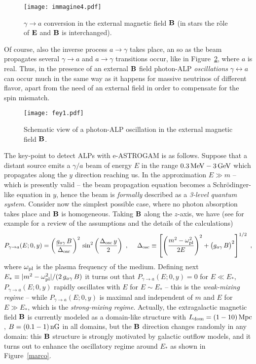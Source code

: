 \documentclass[aps,12pt,tightenlines,amsmath,amssymb]{revtex4}
\begin{document}
\begin{figure}[h]
\centering
\texttt{[image: immagine4.pdf]}
\caption{\label{immagine4(2)} $\gamma \to a$ conversion in the external magnetic field ${\bf B}$ (in stars the 
r\^ole of ${\bf E}$ and ${\bf B}$ is interchanged).}
\end{figure}
\noindent Of course, also the inverse process $a \to \gamma$ takes place, an so as the beam propagates several $\gamma \to a$ and $a \to \gamma$ transitions occur, like in Figure~\ref{fey1}, where $a$ is real. Thus, in the presence of an external ${\bf B}$ field photon-ALP {\it oscillations} $\gamma \leftrightarrow a$ can occur much in the same way as it happens for massive neutrinos of different flavor, apart from the need of an external field in order to compensate for the spin mismatch.      

\begin{figure}[h]
\centering
\texttt{[image: fey1.pdf]}
\caption{\label{fey1} Schematic view of a photon-ALP oscillation in the external magnetic field ${\bf B}$.}
\end{figure}

The key-point to detect ALPs with e-ASTROGAM is as follows. Suppose that a distant source emits a  
$\gamma/a$ beam of energy $E$ in the range $0.3 \, {\rm MeV} - 3 \, {\rm GeV}$ which propagates along the $y$ direction reaching us. In the approximation $E \gg m$ -- which is presently valid -- the beam propagation equation becomes a 
Schr\"odinger-like equation in $y$, hence the beam is {\it formally} described as a {\it 3-level quantum system}. Consider now the simplest possible case, where no photon absorption takes place and $\bf B$ is homogeneous. 
Taking ${\bf B}$ along the $z$-axis, we have (see for example \cite{noi} for a review of the assumptions and the details of the calculations)
\begin{equation} 
P_{\gamma \to a} (E; 0, y) = \left(\frac{g_{a \gamma} \, B}{\Delta_{\rm osc}} \right)^2 \, {\rm sin}^2 \left( \frac{\Delta_{\rm osc} \, y}{2} \right)~, \ \ \ \  {\Delta}_{\rm osc} \equiv \left[\left(\frac{m^2 - {\omega}_{\rm pl}^2}{2 E}  \right)^2 + \bigl(g_{a \gamma} \, B \bigr)^2 \right]^{1/2}~,
\label{a16ghA}
\end{equation}
where ${\omega}_{\rm pl}$ is the plasma frequency of the medium. Defining next $E_* \equiv | m^2 - {\omega}^2_{\rm pl} |/(2 \, g_{a \gamma} \, B)$ it turns out that $P_{\gamma \to a} (E; 0, y) = 0$ for $E \ll E_*$, $P_{\gamma \to a} (E; 0, y)$ rapidly oscillates with $E$ for $E \sim E_*$ -- this is the {\it weak-mixing regime} -- while $P_{\gamma \to a} (E; 0, y)$ is maximal and independent of $m$ and $E$ for $E \gg E_*$, which is the {\it strong-mixing regime}. Actually, the extragalactic magnetic field ${\bf B}$ is currently modeled as a domain-like structure with $L_{\rm dom} = (1 - 10) \, {\rm Mpc}$, $B = (0.1 - 1) \, {\rm nG}$ in all domains, but the ${\bf B}$ direction changes randomly in any domain: this ${\bf B}$ structure is strongly motivated by galactic outflow models, and it turns out to enhance the oscillatory regime around $E_*$ as shown in Figure~\ref{marco}. 
\end{document}
